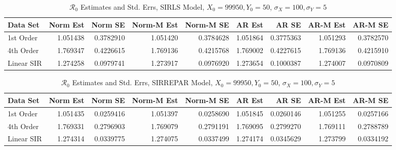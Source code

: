 \documentclass[12pt]{article}
\newcommand{\rr}{\ensuremath{\mathcal{R}_0}}
\begin{document}
\begin{table}[H]
	
	\caption{\label{tab:}$\rr$ Estimates and Std. Errs, SIRLS Model,
		$X_0 = 99950, Y_0 = 50$, $\sigma_X = 100, \sigma_Y = 5$}
	\centering
	\begin{footnotesize}
	\begin{tabular}[t]{l|r|r|r|r|r|r|r|r}
		\hline
		Data Set & Norm Est & Norm SE & Norm-M Est & Norm-M SE & AR Est & AR SE & AR-M Est & AR-M SE\\
		\hline
		1st Order & 1.051438 & 0.3782910 & 1.051420 & 0.3784628 & 1.051864 & 0.3775363 & 1.051293 & 0.3782570\\
		\hline
		4th Order & 1.769347 & 0.4226615 & 1.769136 & 0.4215768 & 1.769002 & 0.4227615 & 1.769136 & 0.4215910\\
		\hline
		Linear SIR & 1.274258 & 0.0979741 & 1.273917 & 0.0976920 & 1.273654 & 0.1000387 & 1.274007 & 0.0970809\\
		\hline
	\end{tabular}
\end{footnotesize}
\end{table}
\begin{table}[H]
	
	\caption{\label{tab:}$\rr$ Estimates and Std. Errs, SIRREPAR Model,
		$X_0 = 99950, Y_0 = 50$, $\sigma_X = 100, \sigma_Y = 5$}
	\centering
	\begin{footnotesize}
	\begin{tabular}[t]{l|r|r|r|r|r|r|r|r}
		\hline
		Data Set & Norm Est & Norm SE & Norm-M Est & Norm-M SE & AR Est & AR SE & AR-M Est & AR-M SE\\
		\hline
		1st Order & 1.051435 & 0.0259416 & 1.051397 & 0.0258690 & 1.051845 & 0.0260146 & 1.051255 & 0.0257166\\
		\hline
		4th Order & 1.769331 & 0.2796903 & 1.769079 & 0.2791191 & 1.769095 & 0.2799270 & 1.769111 & 0.2788789\\
		\hline
		Linear SIR & 1.274314 & 0.0339775 & 1.274075 & 0.0337499 & 1.274174 & 0.0345629 & 1.273799 & 0.0334192\\
		\hline
	\end{tabular}
\end{footnotesize}
\end{table}
\end{document}
